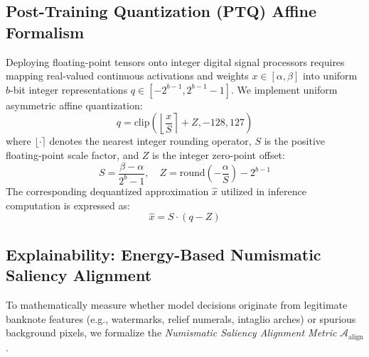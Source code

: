 \documentclass[conference]{IEEEtran}
\begin{document}
\subsection{Post-Training Quantization (PTQ) Affine Formalism}
Deploying floating-point tensors onto integer digital signal processors requires mapping real-valued continuous activations and weights $x \in [\alpha, \beta]$ into uniform $b$-bit integer representations $q \in [-2^{b-1}, 2^{b-1}-1]$. We implement uniform asymmetric affine quantization:
\begin{equation}
    q = \text{clip}\left( \left\lfloor \frac{x}{S} \right\rceil + Z, -128, 127 \right)
    \label{eq:quant}
\end{equation}
where $\lfloor \cdot \rceil$ denotes the nearest integer rounding operator, $S$ is the positive floating-point scale factor, and $Z$ is the integer zero-point offset:
\begin{equation}
    S = \frac{\beta - \alpha}{2^b - 1}, \quad Z = \text{round}\left( -\frac{\alpha}{S} \right) - 2^{b-1}
\end{equation}
The corresponding dequantized approximation $\hat{x}$ utilized in inference computation is expressed as:
\begin{equation}
    \hat{x} = S \cdot (q - Z)
\end{equation}

\subsection{Explainability: Energy-Based Numismatic Saliency Alignment}
To mathematically measure whether model decisions originate from legitimate banknote features (e.g., watermarks, relief numerals, intaglio arches) or spurious background pixels, we formalize the \textit{Numismatic Saliency Alignment Metric} $\mathcal{A}_{\text{align}}$.
\end{document}

